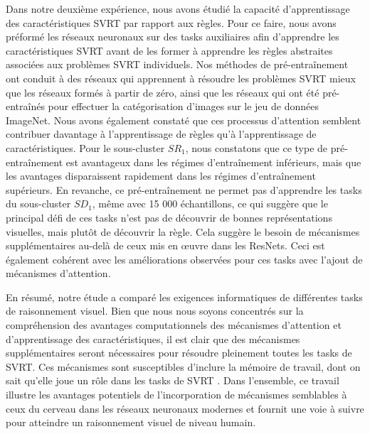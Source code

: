 Dans notre deuxi\`eme exp\'erience, nous avons \'etudi\'e la capacit\'e d'apprentissage des caract\'eristiques SVRT par rapport aux r\`egles. Pour ce faire, nous avons pr\'eform\'e les r\'eseaux neuronaux sur des tasks auxiliaires afin d'apprendre les caract\'eristiques SVRT avant de les former \`a apprendre les r\`egles abstraites associ\'ees aux probl\`emes SVRT individuels. Nos m\'ethodes de pr\'e-entraînement ont conduit \`a des r\'eseaux qui apprennent \`a r\'esoudre les probl\`emes SVRT mieux que les r\'eseaux form\'es \`a partir de z\'ero, ainsi que les r\'eseaux qui ont \'et\'e pr\'e-entraîn\'es pour effectuer la cat\'egorisation d'images sur le jeu de donn\'ees ImageNet. Nous avons \'egalement constat\'e que ces processus d'attention semblent contribuer davantage \`a l'apprentissage de r\`egles qu'\`a l'apprentissage de caract\'eristiques. Pour le sous-cluster $SR_1$, nous constatons que ce type de pr\'e-entraînement est avantageux dans les r\'egimes d'entraînement inf\'erieurs, mais que les avantages disparaissent rapidement dans les r\'egimes d'entraînement sup\'erieurs. En revanche, ce pr\'e-entraînement ne permet pas d'apprendre les tasks du sous-cluster $SD_1$, m\^eme avec 15 000 \'echantillons, ce qui sugg\`ere que le principal d\'efi de ces tasks n'est pas de d\'ecouvrir de bonnes repr\'esentations visuelles, mais plutôt de d\'ecouvrir la r\`egle. Cela sugg\`ere le besoin de m\'ecanismes suppl\'ementaires au-del\`a de ceux mis en œuvre dans les ResNets. Ceci est \'egalement coh\'erent avec les am\'eliorations observ\'ees pour ces tasks avec l'ajout de m\'ecanismes d'attention. 

En r\'esum\'e, notre \'etude a compar\'e les exigences informatiques de diff\'erentes tasks de raisonnement visuel. Bien que nous nous soyons concentr\'es sur la compr\'ehension des avantages computationnels des m\'ecanismes d'attention et d'apprentissage des caract\'eristiques, il est clair que des m\'ecanismes suppl\'ementaires seront n\'ecessaires pour r\'esoudre pleinement toutes les tasks de SVRT. Ces m\'ecanismes sont susceptibles d'inclure la m\'emoire de travail, dont on sait qu'elle joue un rôle dans les tasks de SVRT \citep{AlamiaENEURO.0267-20.2020}. Dans l'ensemble, ce travail illustre les avantages potentiels de l'incorporation de m\'ecanismes semblables \`a ceux du cerveau dans les r\'eseaux neuronaux modernes et fournit une voie \`a suivre pour atteindre un raisonnement visuel de niveau humain. 

